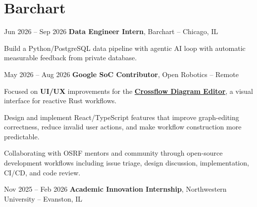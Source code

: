 \section{Barchart}

\vspace{0.20 cm}
\begin{twocolentry}{
        Jun 2026 -- Sep 2026
    }
    {\ResumeEntryTitleFont\textbf{Data Engineer Intern}}, {\ResumeEntryMetaFont Barchart -- Chicago, IL}
\end{twocolentry}

\vspace{0.10 cm}
\begin{onecolentry}
    \begin{highlights}
        \item {\ResumeBulletFont Build a Python/PostgreSQL data pipeline with agentic AI loop with automatic measurable feedback from private database.}
    \end{highlights}
\end{onecolentry}

\vspace{0.20 cm}
\begin{twocolentry}{
        May 2026 -- Aug 2026
    }
    {\ResumeEntryTitleFont\textbf{Google SoC Contributor}}, {\ResumeEntryMetaFont Open Robotics -- Remote}
\end{twocolentry}

\vspace{0.10 cm}
\begin{onecolentry}
    \begin{highlights}
        \item {\ResumeBulletFont Focused on \textbf{UI/UX} improvements for the \href{https://github.com/Open-rmf/crossflow}{\textbf{Crossflow Diagram Editor}}, a visual interface for reactive Rust workflows.}
        \item {\ResumeBulletFont Design and implement React/TypeScript features that improve graph-editing correctness, reduce invalid user actions, and make workflow construction more predictable.}
        \item {\ResumeBulletFont Collaborating with OSRF mentors and community through open-source development workflows including issue triage, design discussion, implementation, CI/CD, and code review.}
    \end{highlights}
\end{onecolentry}

\vspace{0.20 cm}
\begin{twocolentry}{
        Nov 2025 -- Feb 2026
    }
    {\ResumeEntryTitleFont\textbf{Academic Innovation Internship}}, {\ResumeEntryMetaFont Northwestern University -- Evanston, IL}
\end{twocolentry}

